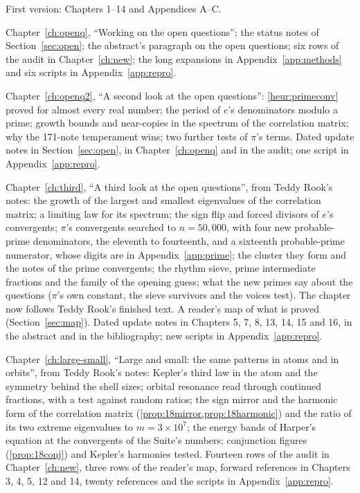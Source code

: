 \begin{description}[style=nextline,leftmargin=2em]
\item[\revO{}] First version: Chapters 1--14 and Appendices A--C.
\item[\revA{}] Chapter~\ref{ch:openq}, ``Working on the open questions''; the status notes of Section~\ref{sec:open}; the abstract's paragraph on the open questions; six rows of the audit in Chapter~\ref{ch:new}; the long expansions in Appendix~\ref{app:methods} and six scripts in Appendix~\ref{app:repro}.
\item[\revB{}] Chapter~\ref{ch:openq2}, ``A second look at the open questions'': \cref{heur:primeconv} proved for almost every real number; the period of $e$'s denominators modulo a prime; growth bounds and near-copies in the spectrum of the correlation matrix; why the 171-note temperament wins; two further tests of $\pi$'s terms. Dated update notes in Section~\ref{sec:open}, in Chapter~\ref{ch:openq} and in the audit; one script in Appendix~\ref{app:repro}.
\item[\revC{}] Chapter~\ref{ch:third}, ``A third look at the open questions'', from Teddy Rook's notes: the growth of the largest and smallest eigenvalues of the correlation matrix; a limiting law for its spectrum; the sign flip and forced divisors of $e$'s convergents; $\pi$'s convergents searched to $n = 50{,}000$, with four new probable-prime denominators, the eleventh to fourteenth, and a sixteenth probable-prime numerator, whose digits are in Appendix~\ref{app:prime}; the cluster they form and the notes of the prime convergents; the rhythm sieve, prime intermediate fractions and the family of the opening guess; what the new primes say about the questions ($\pi$'s own constant, the sieve survivors and the voices test). The chapter now follows Teddy Rook's finished text. A reader's map of what is proved (Section~\ref{sec:map}). Dated update notes in Chapters 5, 7, 8, 13, 14, 15 and 16, in the abstract and in the bibliography; new scripts in Appendix~\ref{app:repro}.
\item[\revD{}] Chapter~\ref{ch:large-small}, ``Large and small: the same patterns in atoms and in orbits'', from Teddy Rook's notes: Kepler's third law in the atom and the symmetry behind the shell sizes; orbital resonance read through continued fractions, with a test against random ratios; the sign mirror and the harmonic form of the correlation matrix (\cref{prop:18mirror,prop:18harmonic}) and the ratio of its two extreme eigenvalues to $m = 3\times10^7$; the energy bands of Harper's equation at the convergents of the Suite's numbers; conjunction figures (\cref{prop:18conj}) and Kepler's harmonies tested. Fourteen rows of the audit in Chapter~\ref{ch:new}, three rows of the reader's map, forward references in Chapters 3, 4, 5, 12 and 14, twenty references and the scripts in Appendix~\ref{app:repro}.

\end{description}
